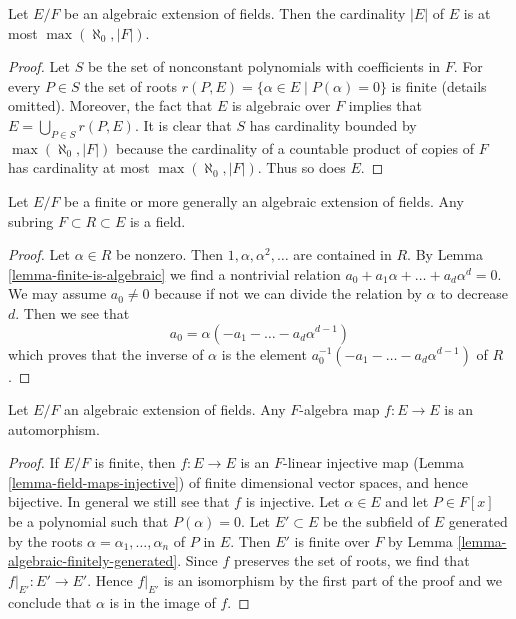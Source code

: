 \begin{lemma}
\label{lemma-size-algebraic-extension}
Let $E/F$ be an algebraic extension of fields. Then the cardinality $|E|$
of $E$ is at most $\max(\aleph_0, |F|)$.
\end{lemma}

\begin{proof}
Let $S$ be the set of nonconstant polynomials with coefficients in $F$.
For every $P \in S$ the set of roots
$r(P, E) = \{\alpha \in E \mid P(\alpha) = 0\}$
is finite (details omitted). Moreover, the fact that $E$ is algebraic
over $F$ implies that $E = \bigcup_{P \in S} r(P, E)$.
It is clear that $S$ has cardinality bounded by $\max(\aleph_0, |F|)$
because the cardinality of a countable product of copies of $F$ has
cardinality at most $\max(\aleph_0, |F|)$.
Thus so does $E$.
\end{proof}

\begin{lemma}
\label{lemma-subalgebra-algebraic-extension-field}
Let $E/F$ be a finite or more generally an algebraic extension of fields.
Any subring $F \subset R \subset E$ is a field.
\end{lemma}

\begin{proof}
Let $\alpha \in R$ be nonzero. Then $1, \alpha, \alpha^2, \ldots$
are contained in $R$. By Lemma \ref{lemma-finite-is-algebraic}
we find a nontrivial relation
$a_0 + a_1 \alpha + \ldots + a_d \alpha^d = 0$.
We may assume $a_0 \not = 0$ because if not we can divide the relation
by $\alpha$ to decrease $d$. Then we see that
$$
a_0 = \alpha (- a_1  - \ldots - a_d \alpha^{d - 1})
$$
which proves that the inverse of $\alpha$ is the element
$a_0^{-1} (- a_1  - \ldots - a_d \alpha^{d - 1})$
of $R$.
\end{proof}

\begin{lemma}
\label{lemma-algebraic-extension-self-map}
Let $E/F$ an algebraic extension of fields. Any $F$-algebra map
$f : E \to E$ is an automorphism.
\end{lemma}

\begin{proof}
If $E/F$ is finite, then $f : E \to E$ is an $F$-linear
injective map (Lemma \ref{lemma-field-maps-injective})
of finite dimensional vector spaces, and hence bijective.
In general we still see that $f$ is injective.
Let $\alpha \in E$ and let $P \in F[x]$ be a
polynomial such that $P(\alpha) = 0$.
Let $E' \subset E$ be the subfield of $E$ generated
by the roots $\alpha = \alpha_1, \ldots, \alpha_n$ of $P$ in $E$.
Then $E'$ is finite over $F$ by Lemma \ref{lemma-algebraic-finitely-generated}.
Since $f$ preserves the set of roots, we find that
$f|_{E'} : E' \to E'$. Hence $f|_{E'}$ is an isomorphism
by the first part of the proof and we conclude that $\alpha$
is in the image of $f$.
\end{proof}






